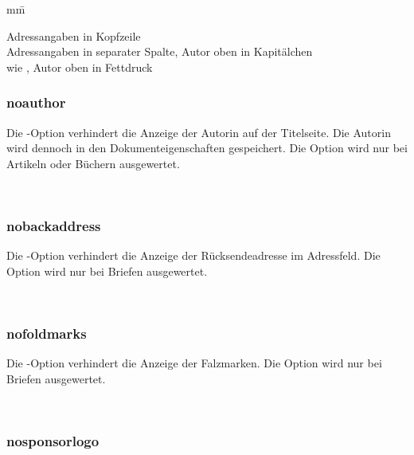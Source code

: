 \begin{tabbing}
	mm\=\kill

	\>Adressangaben in Kopfzeile\\
	\>Adressangaben in separater Spalte, Autor oben in Kapitälchen\\
	\>wie , Autor oben in Fettdruck
\end{tabbing}

\subsubsection{noauthor}

Die -Option verhindert die Anzeige der Autorin auf der Titelseite.
Die Autorin wird dennoch in den Dokumenteigenschaften gespeichert.
Die Option wird nur bei Artikeln oder Büchern ausgewertet.

\begin{nutzung}
		\>\\
\end{nutzung}

\subsubsection{nobackaddress}

Die -Option verhindert die Anzeige der Rücksendeadresse im Adressfeld.
Die Option wird nur bei Briefen ausgewertet.

\begin{nutzung}
		\>\\
\end{nutzung}

\subsubsection{nofoldmarks}

Die -Option verhindert die Anzeige der Falzmarken.
Die Option wird nur bei Briefen ausgewertet.

\begin{nutzung}
		\>\\
\end{nutzung}


\subsubsection{nosponsorlogo}


